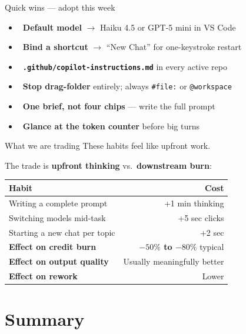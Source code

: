 \documentclass[11pt,aspectratio=169]{beamer}
\newcommand{\good}{\textcolor{successgreen}{\checkmark}}
\newcommand{\hl}[1]{\textbf{\textcolor{accentblue}{#1}}}
\begin{document}
\begin{frame}{Quick wins --- adopt this week}
  \begin{itemize}
    \item \good\ \textbf{Default model} $\rightarrow$ Haiku 4.5 or GPT-5 mini in VS Code
    \item \good\ \textbf{Bind a shortcut} $\rightarrow$ ``New Chat'' for one-keystroke restart
    \item \good\ \textbf{\texttt{.github/copilot-instructions.md}} in every active repo
    \item \good\ \textbf{Stop drag-folder} entirely; always \texttt{\#file:} or \texttt{@workspace}
    \item \good\ \textbf{One brief, not four chips} --- write the full prompt
    \item \good\ \textbf{Glance at the token counter} before big turns
  \end{itemize}
\end{frame}

\begin{frame}{What we are trading}
  These habits feel like upfront work.

  \medskip
  The trade is \hl{upfront thinking} vs.\ \hl{downstream burn}:
  \medskip
  \centering
  \begin{tabular}{lr}
    \toprule
    \textbf{Habit} & \textbf{Cost} \\
    \midrule
    Writing a complete prompt        & +1 min thinking \\
    Switching models mid-task        & +5 sec clicks \\
    Starting a new chat per topic    & +2 sec \\
    \midrule
    \textbf{Effect on credit burn}   & \hl{$-50\%$ to $-80\%$} typical \\
    \textbf{Effect on output quality}& Usually meaningfully better \\
    \textbf{Effect on rework}        & Lower \\
    \bottomrule
  \end{tabular}
\end{frame}

\section{Summary}
\end{document}
